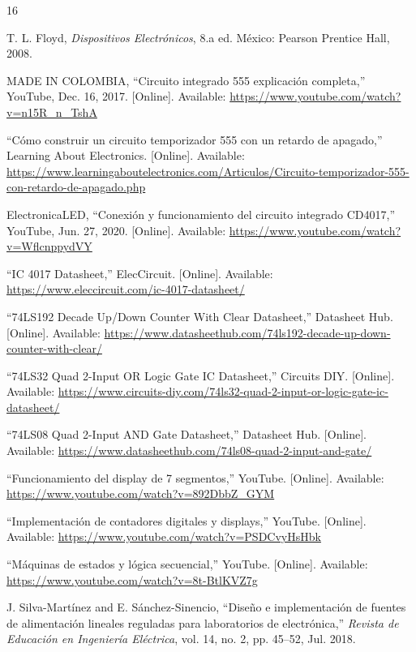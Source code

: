 \documentclass[12pt, journal, onecolumn]{IEEEtran}
\begin{document}
\begin{thebibliography}{16}

T. L. Floyd, \textit{Dispositivos Electrónicos}, 8.a ed. México: Pearson Prentice Hall, 2008.

MADE IN COLOMBIA, ``Circuito integrado 555 explicación completa,'' YouTube, Dec. 16, 2017. [Online]. Available: \url{https://www.youtube.com/watch?v=n15R_n_TshA}

``Cómo construir un circuito temporizador 555 con un retardo de apagado,'' Learning About Electronics. [Online]. Available: \url{https://www.learningaboutelectronics.com/Articulos/Circuito-temporizador-555-con-retardo-de-apagado.php}

ElectronicaLED, ``Conexión y funcionamiento del circuito integrado CD4017,'' YouTube, Jun. 27, 2020. [Online]. Available: \url{https://www.youtube.com/watch?v=WflcnppydVY}

``IC 4017 Datasheet,'' ElecCircuit. [Online]. Available: \url{https://www.eleccircuit.com/ic-4017-datasheet/}

``74LS192 Decade Up/Down Counter With Clear Datasheet,'' Datasheet Hub. [Online]. Available: \url{https://www.datasheethub.com/74ls192-decade-up-down-counter-with-clear/}

``74LS32 Quad 2-Input OR Logic Gate IC Datasheet,'' Circuits DIY. [Online]. Available: \url{https://www.circuits-diy.com/74ls32-quad-2-input-or-logic-gate-ic-datasheet/}

``74LS08 Quad 2-Input AND Gate Datasheet,'' Datasheet Hub. [Online]. Available: \url{https://www.datasheethub.com/74ls08-quad-2-input-and-gate/}

``Funcionamiento del display de 7 segmentos,'' YouTube. [Online]. Available: \url{https://www.youtube.com/watch?v=892DbbZ_GYM}

``Implementación de contadores digitales y displays,'' YouTube. [Online]. Available: \url{https://www.youtube.com/watch?v=PSDCvyHsHbk}

``Máquinas de estados y lógica secuencial,'' YouTube. [Online]. Available: \url{https://www.youtube.com/watch?v=8t-BtlKVZ7g}

J. Silva-Martínez and E. Sánchez-Sinencio, ``Diseño e implementación de fuentes de alimentación lineales reguladas para laboratorios de electrónica,'' \textit{Revista de Educación en Ingeniería Eléctrica}, vol. 14, no. 2, pp. 45--52, Jul. 2018.


\end{thebibliography}
\end{document}
